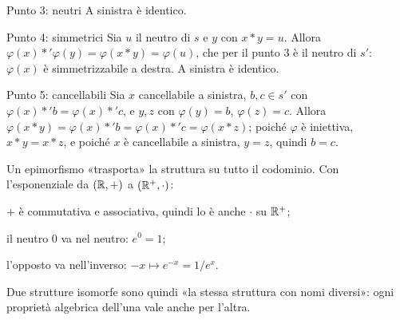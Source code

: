 \begin{concetto}
\begin{dimostrazione}
\begin{caso}{Punto 3: neutri}
        A sinistra è identico.
    \end{caso}
    \begin{caso}{Punto 4: simmetrici}
        Sia $u$ il neutro di $s$ e $y$ con $x * y = u$. Allora $\varphi(x) *' \varphi(y) = \varphi(x * y) = \varphi(u)$, che per il punto 3 è il neutro
        di $s'$: $\varphi(x)$ è simmetrizzabile a destra. A sinistra è identico.
    \end{caso}
    \begin{caso}{Punto 5: cancellabili}
        Sia $x$ cancellabile a sinistra, $b, c \in s'$ con $\varphi(x) *' b = \varphi(x) *' c$, e $y, z$ con $\varphi(y) = b$, $\varphi(z) = c$. Allora
        $\varphi(x * y) = \varphi(x) *' b = \varphi(x) *' c = \varphi(x * z)$; poiché $\varphi$ è iniettiva, $x * y = x * z$, e poiché $x$ è cancellabile
        a sinistra, $y = z$, quindi $b = c$.
    \end{caso}
\end{dimostrazione}
\end{concetto}

\begin{spiegazione}
    Un epimorfismo «trasporta» la struttura su tutto il codominio. Con l'esponenziale da $(\mathbb{R}, +)$ a $(\mathbb{R}^+, \cdot)$:
    \begin{passi}
        \item $+$ è commutativa e associativa, quindi lo è anche $\cdot$ su $\mathbb{R}^+$;
        \item il neutro $0$ va nel neutro: $e^0 = 1$;
        \item l'opposto va nell'inverso: $-x \mapsto e^{-x} = 1 / e^x$.
    \end{passi}
    Due strutture isomorfe sono quindi «la stessa struttura con nomi diversi»: ogni proprietà algebrica dell'una vale anche per l'altra.
\end{spiegazione}

